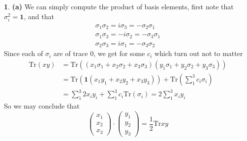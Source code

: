 \documentclass[10.5pt]{article}
\theoremstyle{definition}
\newtheorem{pb}{}
\begin{document}
    \begin{pb}
        \textbf{(a)} We can simply compute the product of basis elements, first note that \(\sigma_i^2 = \mathbf{1}\), and that 
        \begin{align*}
            \sigma_1\sigma_2 = i\sigma_3 = -\sigma_2\sigma_1 \\
            \sigma_1\sigma_3 = -i\sigma_2 = -\sigma_3\sigma_1 \\
            \sigma_2\sigma_3 = i\sigma_1 = -\sigma_3\sigma_2
        \end{align*}
        Since each of \(\sigma_i\) are of trace 0, we get for some \(c_i\) which turn out not to matter
        \begin{align*}
            \text{Tr}(xy) &= \text{Tr}((x_1\sigma_1 + x_2\sigma_2 + x_3\sigma_3)(y_1\sigma_1 + y_2\sigma_2 + y_3\sigma_3)) \\
            &= \text{Tr}(\mathbf{1}(x_1y_1 + x_2y_2 + x_3y_3)) + \text{Tr}(\sum_1^3 c_i \sigma_i) \\
            &= \sum_1^3 2x_iy_i + \sum_1^3 c_i \text{Tr}(\sigma_i) = 2\sum_1^3 x_iy_i
        \end{align*}
        So we may conclude that \[\begin{pmatrix} x_1 \\ x_2 \\ x_3\end{pmatrix}\cdot \begin{pmatrix} y_1 \\ y_2 \\ y_3\end{pmatrix} = \frac12 \text{Tr}xy\]


\end{pb}
\end{document}

